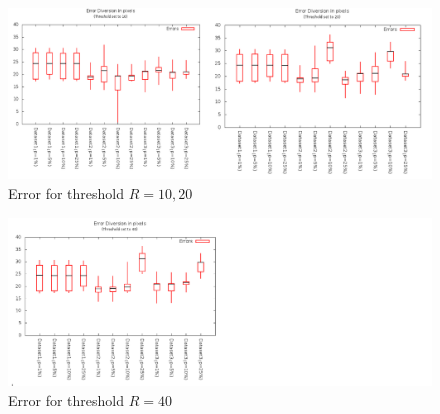 \documentclass[12pt]{article}
\begin{document}
\begin{figure}[h!]
\centering
\includegraphics[width=6in]{GDataPlot17.png}
\caption{Error for threshold $R=10,20$}
\label{fig:error2}
\end{figure}

\begin{figure}[h!]
\centering
\includegraphics[width=6in]{GDataPlot18.png}
\caption{Error for threshold $R=40$}
\label{fig:error3}
\end{figure}

\newpage






\end{document}
